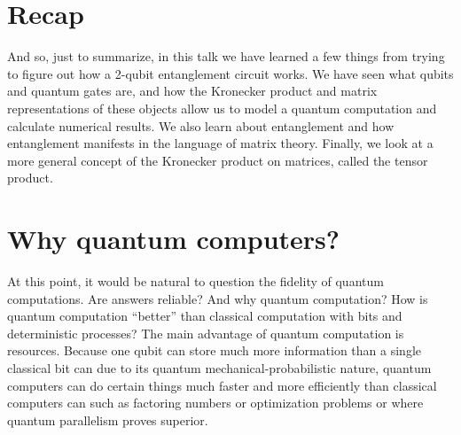 \documentclass[a4paper,11pt]{article}
\numberwithin{equation}{section}
\theoremstyle{definition}
\begin{document}
\section{Recap}
And so, just to summarize, in this talk we have learned a few things from trying to figure out how a 2-qubit entanglement circuit works. We have seen what qubits and quantum gates are, and how the Kronecker product and matrix representations of these objects allow us to model a quantum computation and calculate numerical results. We also learn about entanglement and how entanglement manifests in the language of matrix theory. Finally, we look at a more general concept of the Kronecker product on matrices, called the tensor product. 


\section{Why quantum computers?}

At this point, it would be natural to question the fidelity of quantum computations. Are answers reliable? And why quantum computation? How is quantum computation ``better'' than classical computation with bits and deterministic processes? The main advantage of quantum computation is resources. Because one qubit can store much more information than a single classical bit can due to its quantum mechanical-probabilistic nature, quantum computers can do certain things much faster and more efficiently than classical computers can such as factoring numbers or optimization problems or where quantum parallelism proves superior. 
\end{document}
